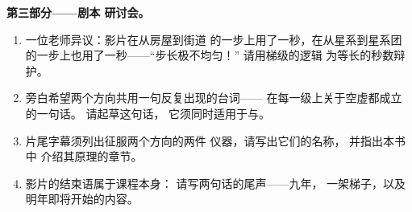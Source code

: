 \begin{problem}
\medskip\noindent\textbf{第三部分——剧本
研讨会。}
\begin{enumerate}[resume]
  \item 一位老师异议：影片在从房屋到街道
        的一步上用了一秒，在从星系到星系团
        的一步上也用了一秒——“步长极不均匀！”
        请用梯级的逻辑
        为等长的秒数辩护。
  \item 旁白希望两个方向共用一句反复出现的台词——
        在每一级上关于空虚都成立的一句话。
        请起草这句话，
        它须同时适用于与。
  \item 片尾字幕须列出征服两个方向的两件
        仪器，请写出它们的名称，
        并指出本书中
        介绍其原理的章节。
  \item 影片的结束语属于课程本身：
        请写两句话的尾声——九年，
        一架梯子，以及明年即将开始的内容。
\end{enumerate}
\end{problem}
